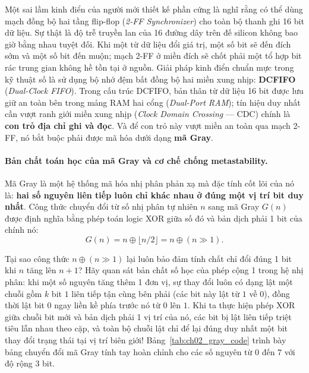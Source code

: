 Một sai lầm kinh điển của người mới thiết kế phần cứng là nghĩ rằng có thể dùng mạch đồng bộ hai tầng flip-flop (\emph{2-FF Synchronizer}) cho toàn bộ thanh ghi 16 bit dữ liệu. Sự thật là độ trễ truyền lan của 16 đường dây trên đế silicon không bao giờ bằng nhau tuyệt đối. Khi một từ dữ liệu đổi giá trị, một số bit sẽ đến đích sớm và một số bit đến muộn; mạch 2-FF ở miền đích sẽ chốt phải một tổ hợp bit rác trung gian không hề tồn tại ở nguồn. Giải pháp kinh điển chuẩn mực trong kỹ thuật số là sử dụng bộ nhớ đệm bất đồng bộ hai miền xung nhịp: \textbf{DCFIFO} (\emph{Dual-Clock FIFO}). Trong cấu trúc DCFIFO, bản thân từ dữ liệu 16 bit được lưu giữ an toàn bên trong mảng RAM hai cổng (\emph{Dual-Port RAM}); tín hiệu duy nhất cần vượt ranh giới miền xung nhịp (\emph{Clock Domain Crossing} --- CDC) chính là \textbf{con trỏ địa chỉ ghi và đọc}. Và để con trỏ này vượt miền an toàn qua mạch 2-FF, nó bắt buộc phải được mã hóa dưới dạng \textbf{mã Gray}.

\paragraph{Bản chất toán học của mã Gray và cơ chế chống metastability.}
Mã Gray là một hệ thống mã hóa nhị phân phản xạ mà đặc tính cốt lõi của nó là: \textbf{hai số nguyên liên tiếp luôn chỉ khác nhau ở đúng một vị trí bit duy nhất}. Công thức chuyển đổi từ số nhị phân tự nhiên $n$ sang mã Gray $G(n)$ được định nghĩa bằng phép toán logic XOR giữa số đó và bản dịch phải 1 bit của chính nó:
\begin{equation}
G(n) = n \oplus \lfloor n/2 \rfloor = n \oplus (n \gg 1).
\end{equation}

Tại sao công thức $n \oplus (n \gg 1)$ lại luôn bảo đảm tính chất chỉ đổi đúng 1 bit khi $n$ tăng lên $n+1$? Hãy quan sát bản chất số học của phép cộng 1 trong hệ nhị phân: khi một số nguyên tăng thêm 1 đơn vị, sự thay đổi luôn có dạng lật một chuỗi gồm $k$ bit $1$ liên tiếp tận cùng bên phải (các bit này lật từ $1$ về $0$), đồng thời lật bit $0$ ngay liền kề phía trước nó từ $0$ lên $1$. Khi ta thực hiện phép XOR giữa chuỗi bit mới và bản dịch phải 1 vị trí của nó, các bit bị lật liên tiếp triệt tiêu lẫn nhau theo cặp, và toàn bộ chuỗi lật chỉ để lại đúng duy nhất một bit thay đổi trạng thái tại vị trí biên giới! Bảng~\ref{tab:ch02_gray_code} trình bày bảng chuyển đổi mã Gray tính tay hoàn chỉnh cho các số nguyên từ $0$ đến $7$ với độ rộng 3 bit.

